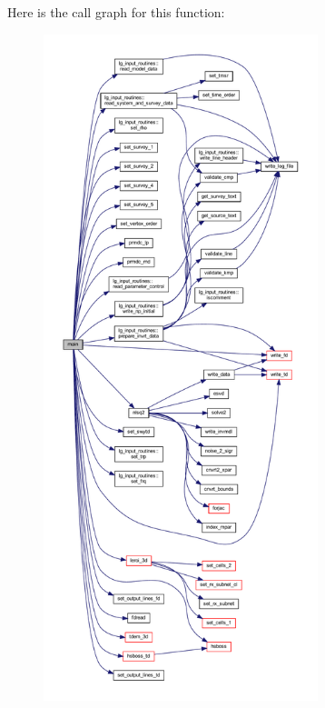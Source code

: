 Here is the call graph for this function\+:\nopagebreak
\begin{figure}[H]
\begin{center}
\leavevmode
\includegraphics[height=550pt]{Leroi_8f90_a8ec2266d83cd6c0b762cbcbc92c0af3d_cgraph}
\end{center}
\end{figure}
\mbox{\label{Leroi_8f90_a37f7ce2aa039b27d2452e812479745a7}} 

